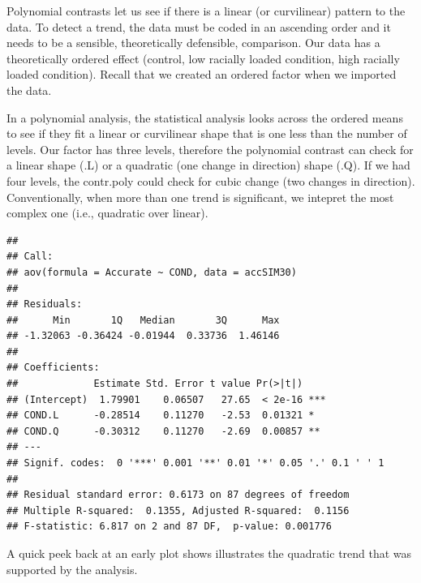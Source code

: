 \documentclass[
  english,
]{book}
\newenvironment{Shaded}{\begin{snugshade}}{\end{snugshade}}
\newcommand{\AttributeTok}[1]{\textcolor[rgb]{0.77,0.63,0.00}{#1}}
\newcommand{\DecValTok}[1]{\textcolor[rgb]{0.00,0.00,0.81}{#1}}
\newcommand{\FunctionTok}[1]{\textcolor[rgb]{0.00,0.00,0.00}{#1}}
\newcommand{\NormalTok}[1]{#1}
\newcommand{\OtherTok}[1]{\textcolor[rgb]{0.56,0.35,0.01}{#1}}
\newcommand{\SpecialCharTok}[1]{\textcolor[rgb]{0.00,0.00,0.00}{#1}}
\begin{document}
Polynomial contrasts let us see if there is a linear (or curvilinear) pattern to the data. To detect a trend, the data must be coded in an ascending order and it needs to be a sensible, theoretically defensible, comparison. Our data has a theoretically ordered effect (control, low racially loaded condition, high racially loaded condition). Recall that we created an ordered factor when we imported the data.

In a polynomial analysis, the statistical analysis looks across the ordered means to see if they fit a linear or curvilinear shape that is one less than the number of levels. Our factor has three levels, therefore the polynomial contrast can check for a linear shape (.L) or a quadratic (one change in direction) shape (.Q). If we had four levels, the contr.poly could check for cubic change (two changes in direction). Conventionally, when more than one trend is significant, we intepret the most complex one (i.e., quadratic over linear).

\begin{Shaded}
\end{Shaded}

\begin{verbatim}
## 
## Call:
## aov(formula = Accurate ~ COND, data = accSIM30)
## 
## Residuals:
##      Min       1Q   Median       3Q      Max 
## -1.32063 -0.36424 -0.01944  0.33736  1.46146 
## 
## Coefficients:
##             Estimate Std. Error t value Pr(>|t|)    
## (Intercept)  1.79901    0.06507   27.65  < 2e-16 ***
## COND.L      -0.28514    0.11270   -2.53  0.01321 *  
## COND.Q      -0.30312    0.11270   -2.69  0.00857 ** 
## ---
## Signif. codes:  0 '***' 0.001 '**' 0.01 '*' 0.05 '.' 0.1 ' ' 1
## 
## Residual standard error: 0.6173 on 87 degrees of freedom
## Multiple R-squared:  0.1355, Adjusted R-squared:  0.1156 
## F-statistic: 6.817 on 2 and 87 DF,  p-value: 0.001776
\end{verbatim}

A quick peek back at an early plot shows illustrates the quadratic trend that was supported by the analysis.
\end{document}
